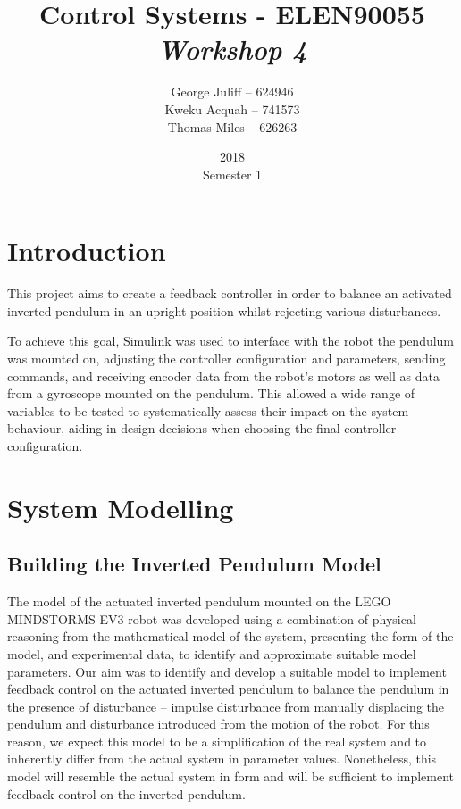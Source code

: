 \documentclass[11pt, a4paper,twocolumn]{article}
\title{\textbf{Control Systems - ELEN90055} \\ \textit{Workshop 4}}
\date{2018\\ Semester 1}
\author{George Juliff -- 624946\\ Kweku Acquah -- 741573\\Thomas Miles -- 626263}
\begin{document}
\maketitle
{}
\clearpage
{}
\section{Introduction}\label{sec:intro}
This project aims to create a feedback controller in order to balance an activated inverted pendulum in an upright position whilst rejecting various disturbances.

To achieve this goal, Simulink was used to interface with the robot the pendulum was mounted on, adjusting the controller configuration and parameters, sending commands, and receiving encoder data from the robot's motors as well as data from a gyroscope mounted on the pendulum. This allowed a wide range of variables to be tested to systematically assess their impact on the system behaviour, aiding in design decisions when choosing the final controller configuration.

\section{	System Modelling	}\label{sec:model}

\subsection{	Building the Inverted Pendulum Model	}
	The model of the actuated inverted pendulum mounted on the LEGO MINDSTORMS EV3 robot was developed using a combination of physical reasoning from the mathematical model of the system, presenting the form of the model, and experimental data, to identify and approximate suitable model parameters.
Our aim was to identify and develop a suitable model to implement feedback control on the actuated inverted pendulum to balance the pendulum in the presence of disturbance – impulse disturbance from manually displacing the pendulum and disturbance introduced from the motion of the robot. For this reason, we expect this model to be a simplification of the real system and to inherently differ from the actual system in parameter values. Nonetheless, this model will resemble the actual system in form and will be sufficient to implement feedback control on the inverted pendulum.
\end{document}
